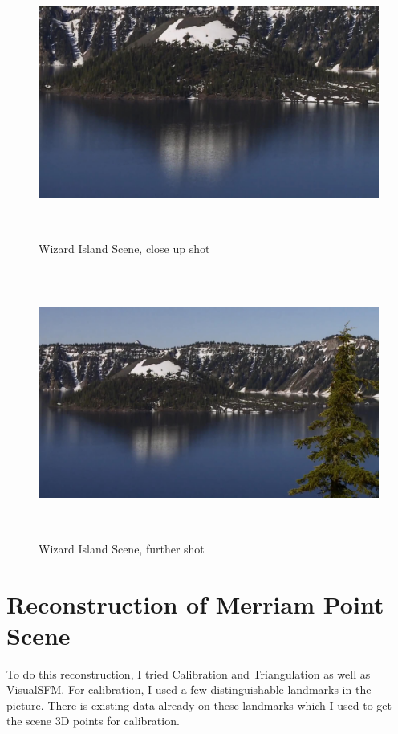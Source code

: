 \documentclass[11pt,psfig]{article}
\begin{document}
\begin{figure}[H]
\centering
\includegraphics[height=3.5in]{sfmPics3/shot1.jpg}
\caption{Wizard Island Scene, close up shot}
\end{figure}
\begin{figure}[H]
\centering
\includegraphics[height=3.5in]{sfmPics3/shot24.jpg}
\caption{Wizard Island Scene, further shot}
\end{figure}

\newpage

\section{Reconstruction of Merriam Point Scene}

To do this reconstruction, I tried Calibration and Triangulation as well as VisualSFM. For calibration, I used a few distinguishable landmarks in the picture. There is existing data already on these landmarks which I used to get the scene 3D points for calibration.  
\end{document}
